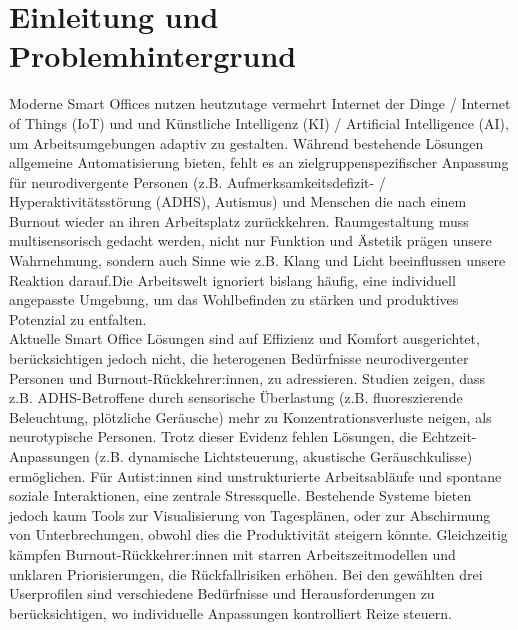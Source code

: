 
\section{Einleitung und Problemhintergrund}

Moderne Smart Offices nutzen heutzutage vermehrt Internet der Dinge / Internet of Things (IoT) und 
und Künstliche Intelligenz (KI) / Artificial Intelligence (AI), um Arbeitsumgebungen adaptiv zu	gestalten. 
Während bestehende Lösungen \cite{ref01} allgemeine Automatisierung bieten, fehlt es an zielgruppenspezifischer Anpassung
für neurodivergente Personen (z.B. Aufmerksamkeitsdefizit- / Hyperaktivitätsstörung (ADHS), Autismus) und Menschen 
die nach einem Burnout wieder an ihren Arbeitsplatz zurückkehren. Raumgestaltung muss multisensorisch gedacht werden, 
nicht nur Funktion und Ästetik prägen unsere Wahrnehmung, sondern auch Sinne wie z.B. Klang und Licht beeinflussen unsere 
Reaktion darauf.Die Arbeitswelt ignoriert bislang häufig, eine individuell angepasste Umgebung, um das Wohlbefinden zu 
stärken und produktives Potenzial zu entfalten. \\

Aktuelle Smart Office Lösungen sind auf Effizienz und Komfort ausgerichtet, 
berücksichtigen jedoch nicht, die heterogenen Bedürfnisse neurodivergenter Personen und 
Burnout-Rückkehrer:innen, zu adressieren. Studien zeigen, dass z.B. ADHS-Betroffene 
durch sensorische Überlastung (z.B. fluoreszierende Beleuchtung, plötzliche Geräusche) 
mehr zu Konzentrationsverluste neigen, als neurotypische Personen.
Trotz dieser Evidenz fehlen Lösungen, die Echtzeit-Anpassungen (z.B. dynamische Lichtsteuerung,
akustische Geräuschkulisse) ermöglichen.
Für Autist:innen sind unstrukturierte Arbeitsabläufe und spontane soziale Interaktionen,
eine zentrale Stressquelle. Bestehende Systeme bieten jedoch kaum Tools zur Visualisierung 
von Tagesplänen, oder zur Abschirmung von Unterbrechungen, obwohl dies die Produktivität 
steigern könnte. Gleichzeitig kämpfen Burnout-Rückkehrer:innen mit starren 
Arbeitszeitmodellen und unklaren Priorisierungen, die Rückfallrisiken erhöhen. Bei den
gewählten drei Userprofilen sind verschiedene Bedürfnisse und Herausforderungen zu
berücksichtigen, wo individuelle Anpassungen kontrolliert Reize steuern. \\

